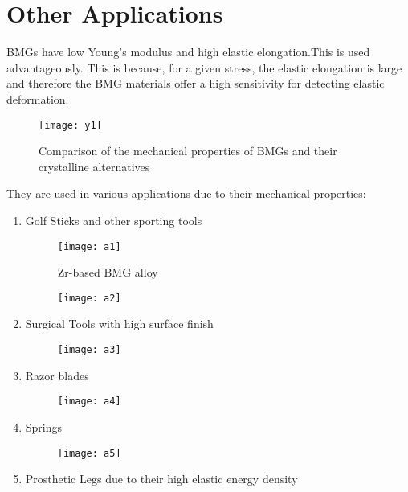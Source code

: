 \chapter{Other Applications}
BMGs have low Young’s modulus and high elastic elongation.This is used advantageously. This is because, for a given stress, the elastic elongation is large and therefore the BMG materials offer a high sensitivity for detecting elastic deformation.

\begin{figure}[h!]
\centering
\texttt{[image: y1]}
\caption{Comparison of the mechanical properties of BMGs and their crystalline alternatives}
\end{figure}

They are used in various applications due to their mechanical properties:
\begin{enumerate}
\item Golf Sticks and other sporting tools
\begin{figure}[h!]
\centering
\texttt{[image: a1]}
\caption{Zr-based BMG alloy}
\end{figure}
\begin{figure}[h!]
\centering
\texttt{[image: a2]}
\end{figure}

\item Surgical Tools with high surface finish


\begin{figure}[h!]
\centering
\texttt{[image: a3]}
\end{figure}

\item Razor blades

\begin{figure}[h!]
\centering
\texttt{[image: a4]}
\end{figure}


\item Springs

\begin{figure}[h!]
\centering
\texttt{[image: a5]}
\end{figure}


\item Prosthetic Legs due to their high elastic energy density

\end{enumerate}